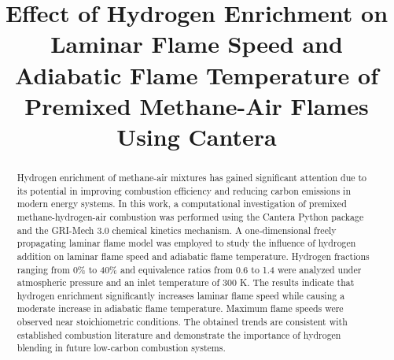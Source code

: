\documentclass[conference]{IEEEtran}
\begin{document}

\title{
Effect of Hydrogen Enrichment on Laminar Flame Speed and Adiabatic Flame Temperature of Premixed Methane-Air Flames Using Cantera
}


\author{



}

\maketitle


\begin{abstract}

Hydrogen enrichment of methane-air mixtures has gained significant attention due to its potential in improving combustion efficiency and reducing carbon emissions in modern energy systems. In this work, a computational investigation of premixed methane-hydrogen-air combustion was performed using the Cantera Python package and the GRI-Mech 3.0 chemical kinetics mechanism. A one-dimensional freely propagating laminar flame model was employed to study the influence of hydrogen addition on laminar flame speed and adiabatic flame temperature. Hydrogen fractions ranging from 0\% to 40\% and equivalence ratios from 0.6 to 1.4 were analyzed under atmospheric pressure and an inlet temperature of 300 K. The results indicate that hydrogen enrichment significantly increases laminar flame speed while causing a moderate increase in adiabatic flame temperature. Maximum flame speeds were observed near stoichiometric conditions. The obtained trends are consistent with established combustion literature and demonstrate the importance of hydrogen blending in future low-carbon combustion systems.

\end{abstract}
\end{document}
